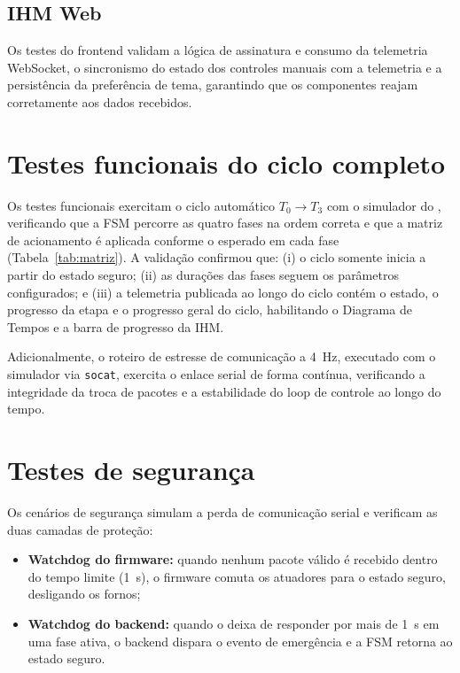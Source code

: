 \subsection{IHM Web}

Os testes do frontend validam a l\'ogica de assinatura e consumo da telemetria
WebSocket, o sincronismo do estado dos controles manuais com a telemetria e a
persist\^encia da prefer\^encia de tema, garantindo que os componentes reajam
corretamente aos dados recebidos.

\section{Testes funcionais do ciclo completo}

Os testes funcionais exercitam o ciclo autom\'atico $T_0 \to T_3$ com o
simulador do \daq, verificando que a FSM percorre as quatro fases na ordem
correta e que a matriz de acionamento \'e aplicada conforme o esperado em cada
fase (Tabela~\ref{tab:matriz}). A valida\c{c}\~ao confirmou que: (i) o ciclo
somente inicia a partir do estado seguro; (ii) as dura\c{c}\~oes das fases
seguem os par\^ametros configurados; e (iii) a telemetria publicada ao longo do
ciclo cont\'em o estado, o progresso da etapa e o progresso geral do ciclo,
habilitando o Diagrama de Tempos e a barra de progresso da IHM.

Adicionalmente, o roteiro de estresse de comunica\c{c}\~ao a 4~Hz, executado com
o simulador via \texttt{socat}, exercita o enlace serial de forma cont\'inua,
verificando a integridade da troca de pacotes e a estabilidade do loop de
controle ao longo do tempo.

\section{Testes de seguran\c{c}a}

Os cen\'arios de seguran\c{c}a simulam a perda de comunica\c{c}\~ao serial e
verificam as duas camadas de prote\c{c}\~ao:

\begin{itemize}
  \item \textbf{Watchdog do firmware:} quando nenhum pacote v\'alido \'e recebido
  dentro do tempo limite (1~s), o firmware comuta os atuadores para o estado
  seguro, desligando os fornos;
  \item \textbf{Watchdog do backend:} quando o \daq deixa de responder por mais
  de 1~s em uma fase ativa, o backend dispara o evento de emerg\^encia e a FSM
  retorna ao estado seguro.
\end{itemize}

